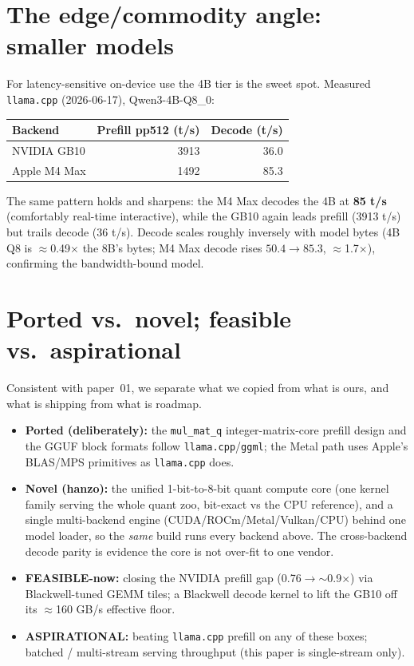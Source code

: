 \documentclass[11pt]{article}
\begin{document}
\section{The edge/commodity angle: smaller models}
For latency-sensitive on-device use the 4B tier is the sweet spot. Measured \texttt{llama.cpp}
(2026-06-17), Qwen3-4B-Q8\_0:
\begin{table}[h]
\centering
\begin{tabular}{l rr}
\toprule
Backend & Prefill pp512 (t/s) & Decode (t/s)\\
\midrule
NVIDIA GB10 & 3913 & 36.0\\
Apple M4 Max & 1492 & 85.3\\
\bottomrule
\end{tabular}
\end{table}

\noindent The same pattern holds and sharpens: the M4 Max decodes the 4B at \textbf{85 t/s}
(comfortably real-time interactive), while the GB10 again leads prefill (3913 t/s) but trails
decode (36 t/s). Decode scales roughly inversely with model bytes (4B Q8 is $\approx$0.49$\times$
the 8B's bytes; M4 Max decode rises $50.4\to85.3$, $\approx$1.7$\times$), confirming the
bandwidth-bound model.

\section{Ported vs.\ novel; feasible vs.\ aspirational}
Consistent with paper~01, we separate what we copied from what is ours, and what is shipping from
what is roadmap.
\begin{itemize}[noitemsep]
  \item \textbf{Ported (deliberately):} the \texttt{mul\_mat\_q} integer-matrix-core prefill design
        and the GGUF block formats follow \texttt{llama.cpp}/\texttt{ggml}; the Metal path uses
        Apple's BLAS/MPS primitives as \texttt{llama.cpp} does.
  \item \textbf{Novel (hanzo):} the unified 1-bit-to-8-bit quant compute core (one kernel family
        serving the whole quant zoo, bit-exact vs the CPU reference), and a single multi-backend
        engine (CUDA/ROCm/Metal/Vulkan/CPU) behind one model loader, so the \emph{same} build runs
        every backend above. The cross-backend decode parity is evidence the core is not over-fit
        to one vendor.
  \item \textbf{FEASIBLE-now:} closing the NVIDIA prefill gap (0.76$\to$$\sim$0.9$\times$) via
        Blackwell-tuned GEMM tiles; a Blackwell decode kernel to lift the GB10 off its
        $\approx$160 GB/s effective floor.
  \item \textbf{ASPIRATIONAL:} beating \texttt{llama.cpp} prefill on any of these boxes; batched /
        multi-stream serving throughput (this paper is single-stream only).
\end{itemize}
\end{document}
